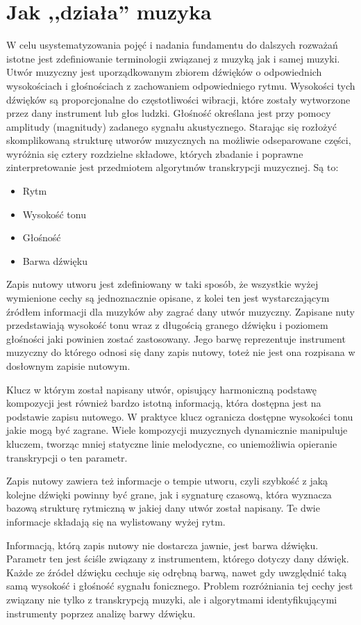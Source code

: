 \documentclass[12pt,a4paper,twoside]{mwart}
\begin{document}
\section{Jak ,,działa'' muzyka}\label{sec:JakDzialaMuzyka}
W celu usystematyzowania pojęć i nadania fundamentu do dalszych rozważań istotne jest zdefiniowanie terminologii związanej z muzyką jak i samej muzyki. Utwór muzyczny jest uporządkowanym zbiorem dźwięków o odpowiednich wysokościach i głośnościach z zachowaniem odpowiedniego rytmu. Wysokości tych dźwięków są proporcjonalne do częstotliwości wibracji, które zostały wytworzone przez dany instrument lub głos ludzki. Głośność określana jest przy pomocy amplitudy (magnitudy) zadanego sygnału akustycznego. Starając się rozłożyć skomplikowaną strukturę utworów muzycznych na możliwie odseparowane części, wyróżnia się cztery rozdzielne składowe, których zbadanie i poprawne zinterpretowanie jest przedmiotem algorytmów transkrypcji muzycznej. Są to:
\begin{itemize}
\item Rytm
\item Wysokość tonu
\item Głośność
\item Barwa dźwięku
\end{itemize}
Zapis nutowy utworu jest zdefiniowany w taki sposób, że wszystkie wyżej wymienione cechy są jednoznacznie opisane, z kolei ten jest wystarczającym źródłem informacji dla muzyków aby zagrać dany utwór muzyczny. Zapisane nuty przedstawiają wysokość tonu wraz z długością granego dźwięku i poziomem głośności jaki powinien zostać zastosowany. Jego barwę reprezentuje instrument muzyczny do którego odnosi się dany zapis nutowy, toteż nie jest ona rozpisana w dosłownym zapisie nutowym.

Klucz w którym został napisany utwór, opisujący harmoniczną podstawę kompozycji jest również bardzo istotną informacją, która dostępna jest na podstawie zapisu nutowego. W praktyce klucz ogranicza dostępne wysokości tonu jakie mogą być zagrane. Wiele kompozycji muzycznych dynamicznie manipuluje kluczem, tworząc mniej statyczne linie melodyczne, co uniemożliwia opieranie transkrypcji o ten parametr.

Zapis nutowy zawiera też informacje o tempie utworu, czyli szybkość z jaką kolejne dźwięki powinny być grane, jak i sygnaturę czasową, która wyznacza bazową strukturę rytmiczną w jakiej dany utwór został napisany. Te dwie informacje składają się na wylistowany wyżej rytm.

Informacją, którą zapis nutowy nie dostarcza jawnie, jest barwa dźwięku. Parametr ten jest ściśle związany z instrumentem, którego dotyczy dany dźwięk. Każde ze źródeł dźwięku cechuje się odrębną barwą, nawet gdy uwzględnić taką samą wysokość i głośność sygnału fonicznego. Problem rozróżniania tej cechy jest związany nie tylko z transkrypcją muzyki, ale i algorytmami identyfikującymi instrumenty poprzez analizę barwy dźwięku.
\end{document}

